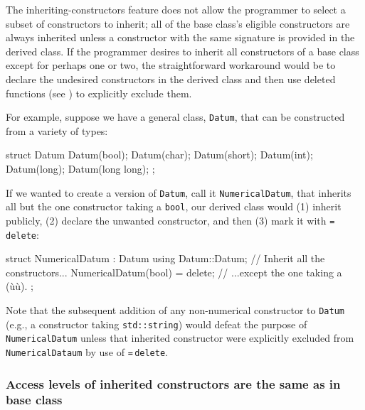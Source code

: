 The inheriting-constructors feature does not allow the programmer
to select a subset of constructors to inherit; all of the base
class's eligible constructors are always inherited unless a constructor
with the same signature is provided in the derived class. If the
programmer desires to inherit all constructors of a base class except
for perhaps one or two, the straightforward workaround would be to
declare the undesired constructors in the derived class and then use
deleted functions (see ) 
to explicitly exclude them.

For example, suppose we have a general class, \lstinline!Datum!, that can
be constructed from a variety of types:

\begin{emcppslisting}[emcppsbatch=e12]
struct Datum
{
    Datum(bool);
    Datum(char);
    Datum(short);
    Datum(int);
    Datum(long);
    Datum(long long);
};
\end{emcppslisting}
    
\noindent If we wanted to create a version of \lstinline!Datum!, call it
\lstinline!NumericalDatum!, that inherits all but the one constructor
taking a \lstinline!bool!, our derived class would (1) inherit publicly, 
(2) declare the unwanted constructor, and then (3) mark it with
\lstinline!=!\,\lstinline!delete!:

\begin{emcppslisting}[emcppsbatch=e12]
struct NumericalDatum : Datum
{
    using Datum::Datum;             // Inherit all the constructors...
    NumericalDatum(bool) = delete;  // ...except the one taking a (ù{}ù).
};
\end{emcppslisting}
    
\noindent Note that the subsequent addition of any non-numerical constructor to
\lstinline!Datum! (e.g., a constructor taking \lstinline!std::string!) would
defeat the purpose of \lstinline!NumericalDatum! unless that inherited constructor were explicitly excluded from \lstinline!NumericalDataum! by use of \lstinline!=!\,\lstinline!delete!.

\subsubsection[Access levels of inherited constructors are the same as in base class]{Access levels of inherited constructors are the same as in base class}\label{access-levels-of-inherited-constructors-are-same-as-in-base-class}

